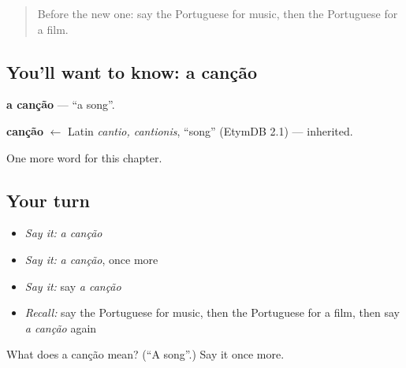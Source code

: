 \label{lesson:PT-C114-cancao}



\begin{quote}
Before the new one: say the Portuguese for music, then the Portuguese for a film.
\end{quote}

\subsection*{You'll want to know: a canção}
\textbf{a canção} — \textquotedblleft{}a song\textquotedblright{}.

\begin{cousinweb}
\textbf{canção} $\leftarrow$ Latin \emph{cantio, cantionis}, \textquotedblleft{}song\textquotedblright{} (EtymDB 2.1) — inherited.
\end{cousinweb}

\begin{grammarlens}[title={What you've built}]
One more word for this chapter.
\end{grammarlens}

\subsection*{Your turn}
\begin{itemize}
\raggedright
  \item \emph{Say it:} \emph{a canção}
  \item \emph{Say it:} \emph{a canção}, once more
  \item \emph{Say it:} say \emph{a canção}
  \item \emph{Recall:} say the Portuguese for music, then the Portuguese for a film, then say \emph{a canção} again
\end{itemize}

\begin{tcolorbox}[breakable,colback=teal!4,colframe=teal!35!black,title={Before you move on}]
What does a canção mean? (\textquotedblleft{}A song\textquotedblright{}.) Say it once more.
\end{tcolorbox}
